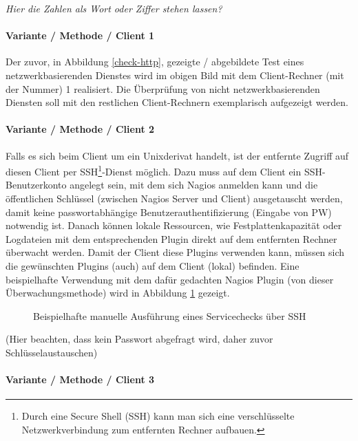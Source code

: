 \textit{Hier die Zahlen als Wort oder Ziffer stehen lassen?}

\paragraph{Variante / Methode / Client 1}

Der zuvor, in Abbildung \ref{check-http}, gezeigte / abgebildete Test eines netzwerkbasierenden Dienstes wird im obigen Bild mit dem Client-Rechner (mit der Nummer) 1 realisiert.
Die Überprüfung von nicht netzwerkbasierenden Diensten soll mit den restlichen Client-Rechnern exemplarisch aufgezeigt werden.

\paragraph{Variante / Methode / Client 2}

Falls es sich beim Client um ein Unixderivat handelt, ist der entfernte Zugriff auf diesen Client per SSH\footnote{Durch eine Secure Shell (\gls{SSH}) kann man sich eine verschlüsselte Netzwerkverbindung zum entfernten Rechner aufbauen.}-Dienst möglich.
Dazu muss auf dem Client ein SSH-Benutzerkonto angelegt sein, mit dem sich Nagios anmelden kann und die öffentlichen Schlüssel (zwischen Nagios Server und Client) ausgetauscht werden, damit keine passwortabhängige Benutzerauthentifizierung (Eingabe von PW) notwendig ist.
Danach können lokale Ressourcen, wie Festplattenkapazität oder Logdateien mit dem entsprechenden Plugin direkt auf dem entfernten Rechner überwacht werden.
Damit der Client diese Plugins verwenden kann, müssen sich die gewünschten Plugins (auch) auf dem Client (lokal) befinden.
Eine beispielhafte Verwendung mit dem dafür gedachten Nagios Plugin  (von dieser Überwachungsmethode) wird in Abbildung \ref{check-ssh} gezeigt.

\begin{figure}[ht]
	\centering
		\caption{Beispielhafte manuelle Ausführung eines Servicechecks über SSH}
		\label{check-ssh}
\end{figure}

(Hier beachten, dass kein Passwort abgefragt wird, daher zuvor Schlüsselaustauschen)

\paragraph{Variante / Methode / Client 3}

